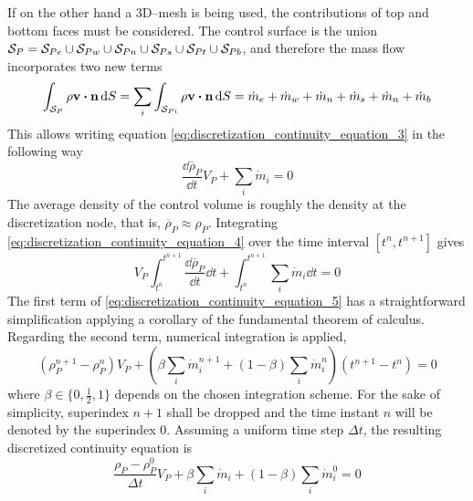 If on the other hand a 3D--mesh is being used, the contributions of top and bottom faces must be considered. The control surface is the union $\mathcal{S}_{P} = \mathcal{S}_{Pe} \cup \mathcal{S}_{Pw} \cup \mathcal{S}_{Pn} \cup \mathcal{S}_{Ps} \cup \mathcal{S}_{Pt} \cup \mathcal{S}_{Pb}$, and therefore the mass flow incorporates two new terms
\begin{equation}
	\int_{\cs{P}} \rho \vb{v} \vdot \vb{n} \dd{S} = 
	\sum_{i} \int_{\cs{Pi}} \rho \vb{v} \vdot \vb{n} \dd{S} = 
	\dot{m}_e + \dot{m}_w + \dot{m}_n + \dot{m}_s + \dot{m}_n + \dot{m}_b
\end{equation}
This allows writing equation \eqref{eq:discretization_continuity_equation_3} in the following way
\begin{equation} \label{eq:discretization_continuity_equation_4}
	\frac{\dd \overline{\rho}_P}{\dd{t}} V_P + \sum_i \dot{m}_i = 0
\end{equation}
The average density of the control volume is roughly the density at the discretization node, that is, $\overline{\rho}_P \approx \rho_P$. Integrating \eqref{eq:discretization_continuity_equation_4} over the time interval $[t^n, t^{n+1}]$ gives
\begin{equation} \label{eq:discretization_continuity_equation_5}
	V_P \int_{t^n}^{t^{n+1}} \frac{\dd \overline{\rho}_P}{\dd{t}} \dd{t} + 
	\int_{t^n}^{t^{n+1}} \sum_i \dot{m}_i \dd{t} = 0
\end{equation}
The first term of \eqref{eq:discretization_continuity_equation_5} has a straightforward simplification applying a corollary of the fundamental theorem of calculus. Regarding the second term, numerical integration is applied,
\begin{equation} \label{eq:discretization_continuity_equation_6}
	(\rho_P^{n+1} - \rho_P^n) V_P + 
	\left( \beta \sum_i \dot{m}_i^{n+1} + (1 - \beta) \sum_i \dot{m}_i^{n} \right) (t^{n+1} - t^n) = 0
\end{equation}
where $\beta \in \{ 0, \frac{1}{2}, 1 \}$ depends on the chosen integration scheme. For the sake of simplicity, superindex $n+1$ shall be dropped and the time instant $n$ will be denoted by the superindex $0$. Assuming a uniform time step $\Delta t$, the resulting discretized continuity equation is
\begin{equation}
	\frac{\rho_P - \rho_P^0}{\Delta t} V_P + \beta \sum_i \dot{m}_i + (1 - \beta) \sum_i \dot{m}_i^0 = 0
\end{equation}





